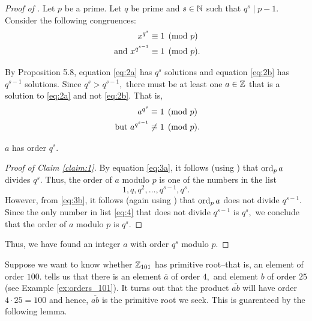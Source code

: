 \documentclass[letterpaper, 11 pt]{ximera}
\theoremstyle{definition}
\begin{document}
\begin{proof}[Proof of ]
    Let $p$ be a prime. Let $q$ be prime and $s\in\mathbb N$ such that $q^s\mid p-1.$ Consider the following congruences: 
    \begin{subequations}
        \begin{align}
            x^{q^s}&\equiv 1\pmod{p}\label{eq:2a}\\
            \textnormal{ and } 
            x^{q^{s-1}}&\equiv 1\pmod{p}.\label{eq:2b}
        \end{align}
    \end{subequations}


    By Proposition 5.8, equation \eqref{eq:2a} has $q^s$ solutions and equation \eqref{eq:2b} has $q^{s-1}$ solutions. Since $q^s > q^{s-1},$ there must be at least one $a\in\mathbb Z$ that is a solution to \eqref{eq:2a} and not \eqref{eq:2b}. That is, 
    \begin{subequations}
        \begin{align}
            a^{q^s}&\equiv 1\pmod{p}\label{eq:3a}\\
            \textnormal{ but } 
            a^{q^{s-1}}&\not\equiv 1\pmod{p}.\label{eq:3b}
        \end{align}
    \end{subequations}
    

    \begin{claim}\label{claim:1}
        $a$ has order $q^s.$
    \end{claim}

    \begin{proof}[Proof of Claim \ref{claim:1}]\renewcommand{\qedsymbol}{}
        By equation \eqref{eq:3a}, it follows (using ) that $\operatorname{ord}_p a$ divides $q^s.$ Thus, the order of $a$ modulo $p$ is one of the numbers in the list 
        \begin{equation}1,q,q^2,\dots,q^{s-1},q^s.\label{eq:4}
        \end{equation}
        However, from \eqref{eq:3b}, it follows (again using ) that $\operatorname{ord}_p a$ does not divide $q^{s-1}.$ Since the only number in list \eqref{eq:4} that does not divide $q^{s-1}$ is $q^s,$ we conclude that the order of $a$ modulo $p$ is $q^s.$
    \end{proof}
    Thus, we have found an integer $a$ with order $q^s$ modulo $p.$
\end{proof}

Suppose we want to know whether $\mathbb Z_{101}$ has primitive root--that is, an element of order $100.$  tells us that there is an element $\overline{a}$ of order $4,$ and element $b$ of order $25$ (see Example \ref{ex:orders_101}). It turns out that the product $\overline{ab}$ will have order $4\cdot 25=100$ and hence, $\overline{ab}$ is the primitive root we seek. This is guarenteed by the following lemma.
\end{document}
